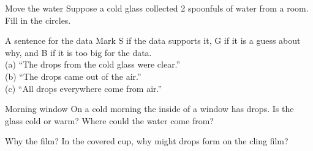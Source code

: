 \clearpage

\begin{puzzle}{Move the water}
Suppose a cold glass collected 2 spoonfuls of water from a room. Fill in the circles.
\begin{center}
\end{center}
\end{puzzle}

\begin{puzzle}{A sentence for the data}
Mark S if the data supports it, G if it is a guess about why, and B if it is too big for the data.\\
(a) ``The drops from the cold glass were clear.'' \wline[1cm]\\
(b) ``The drops came out of the air.'' \wline[1cm]\\
(c) ``All drops everywhere come from air.'' \wline[1cm]
\end{puzzle}

\begin{puzzle}{Morning window}
On a cold morning the inside of a window has drops. Is the glass cold or warm? \wline[3cm] Where could the water come from? \wline[4cm]
\end{puzzle}

\begin{puzzle}{Why the film?}
In the covered cup, why might drops form on the cling film? \wline[6cm]
\end{puzzle}
\clearpage
